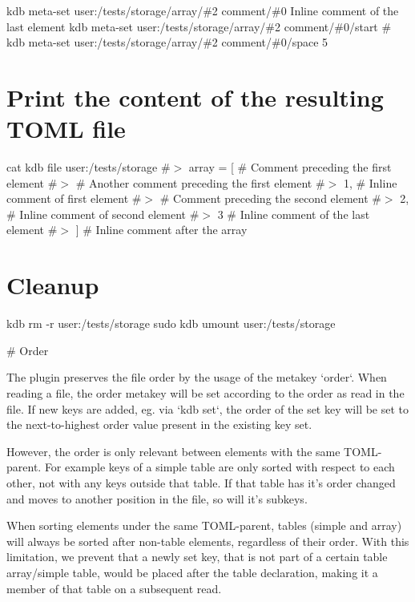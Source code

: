 kdb meta-\/set \textquotesingle{}user\+:/tests/storage/array/\#2\textquotesingle{} \textquotesingle{}comment/\#0\textquotesingle{} \textquotesingle{} Inline comment of the last element\textquotesingle{} kdb meta-\/set \textquotesingle{}user\+:/tests/storage/array/\#2\textquotesingle{} \textquotesingle{}comment/\#0/start\textquotesingle{} \textquotesingle{}\#\textquotesingle{} kdb meta-\/set \textquotesingle{}user\+:/tests/storage/array/\#2\textquotesingle{} \textquotesingle{}comment/\#0/space\textquotesingle{} \textquotesingle{}5\textquotesingle{}\hypertarget{autotoc_md635_autotoc_md731}{}\section{Print the content of the resulting T\+O\+M\+L file}\label{autotoc_md635_autotoc_md731}
cat {\ttfamily kdb file user\+:/tests/storage} \#$>$ array = \mbox{[} \# Comment preceding the first element \#$>$ \# Another comment preceding the first element \#$>$ 1, \# Inline comment of first element \#$>$ \# Comment preceding the second element \#$>$ 2, \# Inline comment of second element \#$>$ 3 \# Inline comment of the last element \#$>$ \mbox{]} \# Inline comment after the array\hypertarget{autotoc_md635_autotoc_md732}{}\section{Cleanup}\label{autotoc_md635_autotoc_md732}
kdb rm -\/r user\+:/tests/storage sudo kdb umount user\+:/tests/storage 
\begin{DoxyCode}
# Order

The plugin preserves the file order by the usage of the metakey `order`. When reading a file, the order
       metakey will be set according to the order as read in the file.
If new keys are added, eg. via `kdb set`, the order of the set key will be set to the next-to-highest order
       value present in the existing key set.

However, the order is only relevant between elements with the same TOML-parent. For example keys of a
       simple table are only sorted with respect to each other, not with any keys outside that table. If that table has
       it's order changed and moves to another position in the file, so will it's subkeys.

When sorting elements under the same TOML-parent, tables (simple and array) will always be sorted after
       non-table elements, regardless of their order.
With this limitation, we prevent that a newly set key, that is not part of a certain table array/simple
       table, would be placed after the table declaration, making it a member of that table on a subsequent read.
\end{DoxyCode}
